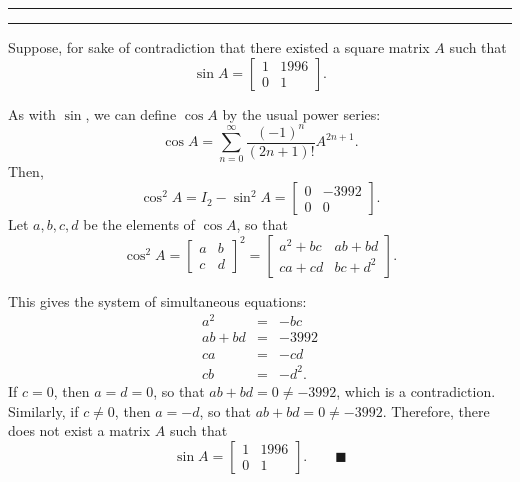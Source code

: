 \documentclass[11pt]{article}
\newcounter{questionCounter}
\newcounter{partCounter}[questionCounter]
\newenvironment{question}[2][\arabic{questionCounter}]{%
    \setcounter{partCounter}{0}%
    \vspace{.25in} \hrule \vspace{0.5em}%
        \noindent{\bf #2}%
    \vspace{0.8em} \hrule \vspace{.10in}%
    \addtocounter{questionCounter}{1}%
}{}
\begin{document}
\begin{question}{Exercise 5}
Suppose, for sake of contradiction that there existed a square matrix $A$ such
that \[\sin A = \left[\begin{array}{cc} 1 & 1996 \\ 0 & 1 \end{array}\right].\]

As with $\sin$, we can define $\cos A$ by the usual power series:
\[\cos A = \sum_{n = 0}^{\infty} \frac{(-1)^n}{(2n + 1)!} A^{2n + 1}.\]
Then,
\[\cos^2 A = I_2 - \sin^2 A = \left[\begin{array}{cc} 0 & -3992 \\ 0 & 0 \end{array}\right].\]
Let $a,b,c,d$ be the elements of $\cos A$, so that
\[\cos^2 A = \left[\begin{array}{cc} a & b \\ c & d \end{array}\right]^2 =
  \left[\begin{array}{cc} a^2 + bc & ab + bd \\ ca + cd & bc + d^2 \end{array}\right].\]

This gives the system of simultaneous equations:
\begin{eqnarray*}
a^2     & = & - bc   \\
ab + bd & = & - 3992 \\
ca      & = & - cd   \\
cb      & = & - d^2.
\end{eqnarray*}
If $c = 0$, then $a = d = 0$, so that $ab + bd = 0 \neq -3992$, which is a
contradiction. Similarly, if $c \neq 0$, then $a = - d$, so that
$ab + bd = 0 \neq -3992$. Therefore, there does not exist a matrix $A$ such
that
\[\sin A = \left[\begin{array}{cc} 1 & 1996 \\ 0 & 1 \end{array}\right].\qquad \blacksquare\]
\end{question}
\end{document}
